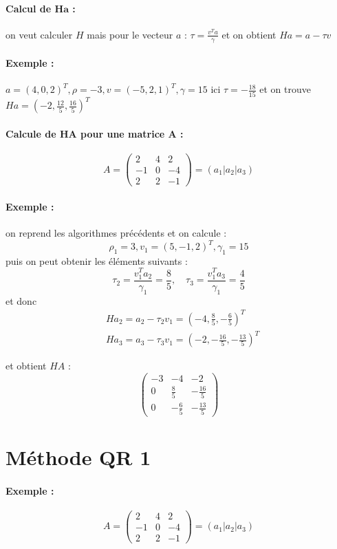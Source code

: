 \documentclass[11pt,a4paper]{report}
\begin{document}
\paragraph*{Calcul de $\textbf{Ha}$ : } on veut calculer $H$ mais pour le vecteur $a$ : $\tau = \frac{v^Ta}{\gamma}$ et on obtient $Ha=a-\tau v$

\paragraph*{Exemple : } $a=(4,0,2)^T, \rho=-3, v=(-5,2,1)^T, \gamma = 15$ ici $\tau = -\frac{18}{15}$ et on trouve $Ha = (-2,\frac{12}{5},\frac{16}{5})^T$

\paragraph*{Calcule de $\textbf{HA}$ pour une matrice $\textbf{A}$ : } 
$$
A = \begin{pmatrix}
2 & 4 & 2\\
-1 & 0 & -4 \\
2 & 2 & -1
\end{pmatrix} = (a_1|a_2|a_3)
$$

\paragraph*{Exemple : } on reprend les algorithmes précédents et on calcule :
$$
\rho_1 = 3, v_1 = (5,-1,2)^T, \gamma_1 = 15
$$
puis on peut obtenir les éléments suivants :
$$
\tau_2 = \frac{v^T_1 a_2}{\gamma_1} = \frac{8}{5}, \quad 
\tau_3 = \frac{v^T_1 a_3}{\gamma_1} = \frac{4}{5}
$$
et donc
\begin{align*}
& Ha_2 = a_2 - \tau_2v_1 = (-4,\frac{8}{5},-\frac{6}{5})^T \\
& Ha_3 = a_3 - \tau_3v_1 = (-2,-\frac{16}{5},-\frac{13}{5})^T
\end{align*}

et obtient $HA$ :
$$
\begin{pmatrix}
-3 & -4 & -2 \\
0 & \frac{8}{5} & -\frac{16}{5} \\
0 & -\frac{6}{5} & -\frac{13}{5}
\end{pmatrix}
$$

\section{Méthode QR 1}

\paragraph*{Exemple : }
$$
A = \begin{pmatrix}
2 & 4 & 2 \\
-1 & 0 & -4 \\
2 & 2 & -1
\end{pmatrix} = (a_1|a_2|a_3)
$$
\end{document}
